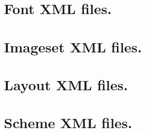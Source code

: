 \let\mypdfximage\pdfximage\def\pdfximage{\immediate\mypdfximage}\documentclass[twoside]{book}
\newcommand{\+}{\discretionary{\mbox{\scriptsize$\hookleftarrow$}}{}{}}
\newcommand{\clearemptydoublepage}{%
  \newpage{\pagestyle{empty}\cleardoublepage}%
}
\begin{document}
\chapter{Font X\+ML files.}
\label{xml_font}

\chapter{Imageset X\+ML files.}
\label{xml_imageset}

\chapter{Layout X\+ML files.}
\label{xml_layout}

\chapter{Scheme X\+ML files.}
\label{xml_scheme}


\backmatter
\newpage
{}
\clearemptydoublepage
{}
\printindex
\end{document}
